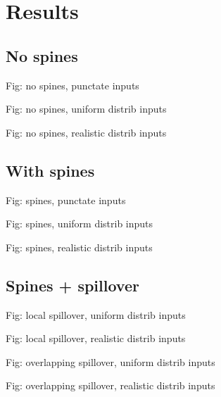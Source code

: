 \section{Results}

\subsection{No spines} 

Fig: no spines, punctate inputs

Fig: no spines, uniform distrib inputs

Fig: no spines, realistic distrib inputs


\subsection{With spines}

Fig: spines, punctate inputs

Fig: spines, uniform distrib inputs

Fig: spines, realistic distrib inputs


\subsection{Spines + spillover}

Fig: local spillover, uniform distrib inputs

Fig: local spillover, realistic distrib inputs

Fig: overlapping spillover, uniform distrib inputs

Fig: overlapping spillover, realistic distrib inputs
